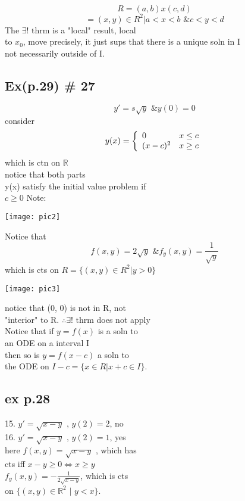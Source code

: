   \[ R = (a, b)x(c, d)\]
  \[ = {(x, y) \in R^2 | a < x < b \text{ \& }  c < y < d } \]
  The \( \exists \text{! thrm} \) is a "local" result, local \\
  to \(x_0\), move precisely, it just sups that there is a unique soln in I \\
  not necessarily outside of I. \\

  \subsection*{Ex(p.29) \# 27}
  
  \[ y' = s \sqrt{y} \text{ \& } y(0) = 0\]
  consider 
  \[ y(x) = \left\{
  \begin{array}{l l}
	0 & x\leq c \\
	(x-c)^2 &  x \geq c
  \end{array}\right. \]
  which is ctn on \( \mathbb{R} \)  \\
  notice that both parts  \\
  y(x) satisfy the initial value problem if \\
  \( c \geq 0\) Note: 

  \texttt{[image: pic2]}

  Notice that
  \[ f(x, y) = 2\sqrt{y} \text{ \& } f_y(x, y) = \frac{1}{ \sqrt{y}}\]
  which is cts on \( R = \{ (x, y) \in R^2 |  y > 0\}\)

  \texttt{[image: pic3]}

  notice that (0, 0) is not in R, not \\
  "interior" to R. \( \therefore \exists \text{! thrm}\) does not apply
  \\
  Notice that if \( y = f(x) \) is a soln to \\
  an ODE on a interval I  \\
  then so is \( y = f(x-c)\) a soln to  \\
  the ODE on \( I - c =\{ x \in R | x + c \in I\}\).  \\

  \newpage 
{}
  \subsection*{ ex p.28 }
  15. \( y' = \sqrt{x-y} \text{ ,  } y(2) = 2 \),  no \\
  16. \( y' = \sqrt{x-y} \text{ ,  } y(2) = 1 \),  yes \\
  here \( f(x, y) = \sqrt{x-y}\) , which has \\
  cts iff  \( x-y \geq 0 \iff x \geq y\) \\ 
  \( f_y(x, y) = - \frac{1}{2\sqrt{x-y}}\),  which is cts \\
  on \( \{ (x,y) \in \mathbb{R}^2 \text{ | } y<x \}\). \\
